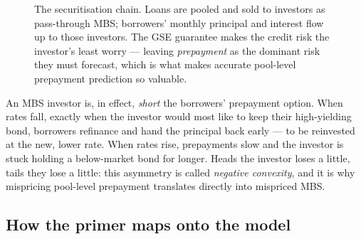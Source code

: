 \documentclass[11pt]{article}
\begin{document}
\begin{figure}[H]
\centering
{}
\caption{The securitisation chain. Loans are pooled and sold to investors as pass-through MBS;
borrowers' monthly principal and interest flow up to those investors. The GSE guarantee makes
the credit risk the investor's least worry --- leaving \emph{prepayment} as the dominant risk
they must forecast, which is what makes accurate pool-level prepayment prediction so valuable.}
\end{figure}

\begin{intuition}
An MBS investor is, in effect, \emph{short} the borrowers' prepayment option. When rates fall,
exactly when the investor would most like to keep their high-yielding bond, borrowers refinance
and hand the principal back early --- to be reinvested at the new, lower rate. When rates rise,
prepayments slow and the investor is stuck holding a below-market bond for longer. Heads the
investor loses a little, tails they lose a little: this asymmetry is called \emph{negative
convexity}, and it is why mispricing pool-level prepayment translates directly into mispriced
MBS.
\end{intuition}

\subsection{How the primer maps onto the model}
\end{document}
